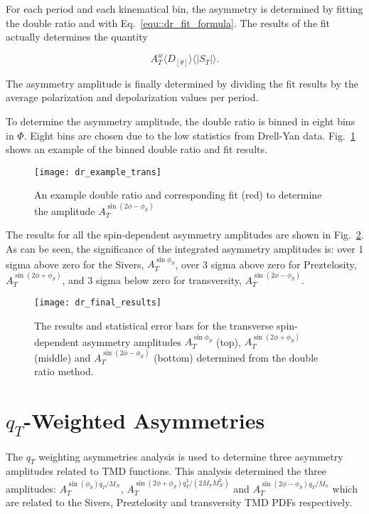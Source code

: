 For each period and each kinematical bin, the asymmetry is determined by fitting
the double ratio and with Eq.~\ref{equ::dr_fit_formula}.  The results of the fit
actually determines the quantity

\begin{equation}
  A^w_T \langle D_{[\theta]} \rangle \langle |S_T|\rangle.
\end{equation}
\noindent


The asymmetry amplitude is finally
determined by dividing the fit results by the average polarization and
depolarization values per period.

To determine the asymmetry amplitude, the double ratio is binned in eight bins
in $\Phi$.  Eight bins are chosen due to the low statistics from Drell-Yan data.
Fig.~\ref{fig::dr_example_trans} shows an example of the binned double ratio and
fit results.

\begin{figure}[h!t]
  \centering \texttt{[image: dr\_example\_trans]}
  \caption{An example double ratio and corresponding fit (red) to determine the
    amplitude $A_T^{\sin(2\phi-\phi_S)}$}
  \label{fig::dr_example_trans}
\end{figure}

\noindent
The results for all the spin-dependent asymmetry amplitudes are shown in
Fig.~\ref{fig::dr_final_results}.  As can be seen, the significance of the
integrated asymmetry amplitudes is: over 1 sigma above zero for the Sivers,
$A^{\sin\phi_S}_T$, over 3 sigma above zero for Preztelosity,
$A^{\sin(2\phi+\phi_S)}_T$, and 3 sigma below zero for transversity,
$A^{\sin(2\phi-\phi_S)}_T$.

\begin{figure}[h!t]
  \centering \texttt{[image: dr\_final\_results]}
  \caption{The results and statistical error bars for the transverse
    spin-dependent asymmetry amplitudes $A^{\sin\phi_S}_T$ (top),
    $A^{\sin(2\phi+\phi_S)}_T$ (middle) and $A^{\sin(2\phi-\phi_S)}_T$ (bottom)
    determined from the double ratio method.}
  \label{fig::dr_final_results}
\end{figure}


\section{$q_T$-Weighted Asymmetries} \label{sec::qtweighted}
The $q_T$ weighting asymmetries analysis is used to determine three asymmetry
amplitudes related to TMD functions.  This analysis determined the three
amplitudes: $A_T^{\sin(\phi_S) q_T/M_N}$, $A_T^{\sin(2\phi+\phi_S)
  q^3_T/(2M_{\pi}M_N^2)}$ and $A_T^{\sin(2\phi-\phi_S) q_T/M_{\pi}}$ which are
related to the Sivers, Preztelosity and transversity TMD PDFs respectively.

